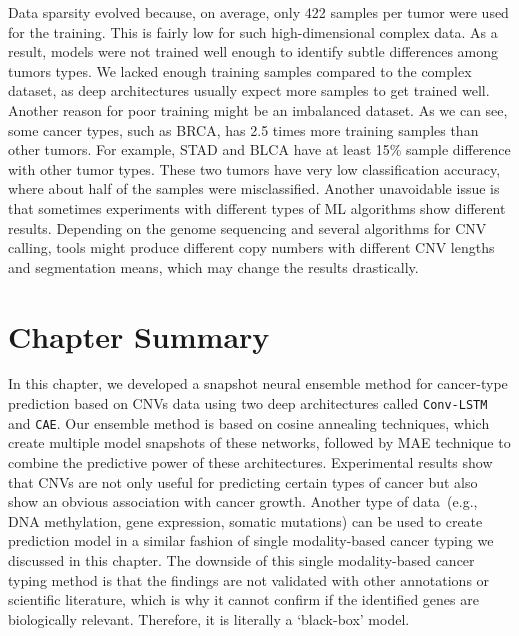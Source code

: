 \hspace*{3.5mm} Data sparsity evolved because, on average, only 422 samples per tumor were used for the training. This is fairly low for such high-dimensional complex data. As a result, models were not trained well enough to identify subtle differences among tumors types. We lacked enough training samples compared to the complex dataset, as deep architectures usually expect more samples to get trained well. %
Another reason for poor training might be an imbalanced dataset. As we can see, some cancer types, such as BRCA, has 2.5 times more training samples than other tumors. For example, STAD and BLCA have at least 15\% sample difference with other tumor types. These two tumors have very low classification accuracy, where about half of the samples were misclassified. Another unavoidable issue is that sometimes experiments with different types of ML algorithms show different results. Depending on the genome sequencing and several algorithms for CNV calling,  tools might produce different copy numbers with different CNV lengths and segmentation means, which may change the results drastically.

\section{Chapter Summary} \label{chapter_3:conclusion}
In this chapter, we developed a snapshot neural ensemble method for cancer-type prediction based on CNVs data using two deep architectures called \texttt{Conv-LSTM} and \texttt{CAE}. Our ensemble method is based on cosine annealing techniques, which create multiple model snapshots of these networks, followed by MAE technique to combine the predictive power of these architectures. Experimental results show that CNVs are not only useful for predicting certain types of cancer but also show an obvious association with cancer growth. Another type of data~(e.g., DNA methylation, gene expression, somatic mutations) can be used to create prediction model in a similar fashion of single modality-based cancer typing we discussed in this chapter. The downside of this single modality-based cancer typing method is that the findings are not validated with other annotations or scientific literature, which is why it cannot confirm if the identified genes are biologically relevant. Therefore, it is literally a `black-box' model. 

